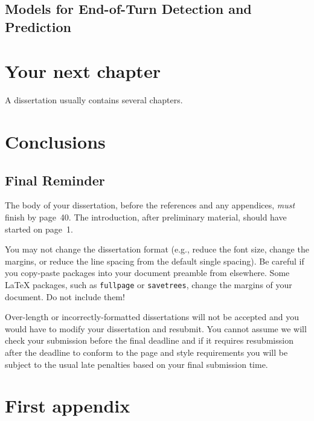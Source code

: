 \documentclass[logo,bsc,singlespacing,parskip]{infthesis}
\begin{document}
\section{Models for End-of-Turn Detection and Prediction}




\chapter{Your next chapter}

A dissertation usually contains several chapters.

\chapter{Conclusions}

\section{Final Reminder}

The body of your dissertation, before the references and any appendices,
\emph{must} finish by page~40. The introduction, after preliminary material,
should have started on page~1.

You may not change the dissertation format (e.g., reduce the font size, change
the margins, or reduce the line spacing from the default single spacing). Be
careful if you copy-paste packages into your document preamble from elsewhere.
Some \LaTeX{} packages, such as \texttt{fullpage} or \texttt{savetrees}, change
the margins of your document. Do not include them!

Over-length or incorrectly-formatted dissertations will not be accepted and you
would have to modify your dissertation and resubmit. You cannot assume we will
check your submission before the final deadline and if it requires resubmission
after the deadline to conform to the page and style requirements you will be
subject to the usual late penalties based on your final submission time.

% 




\appendix

\chapter{First appendix}
\end{document}
